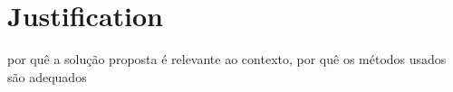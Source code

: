 \section{Justification}

por quê a solução proposta é relevante ao contexto, por quê os métodos usados são adequados